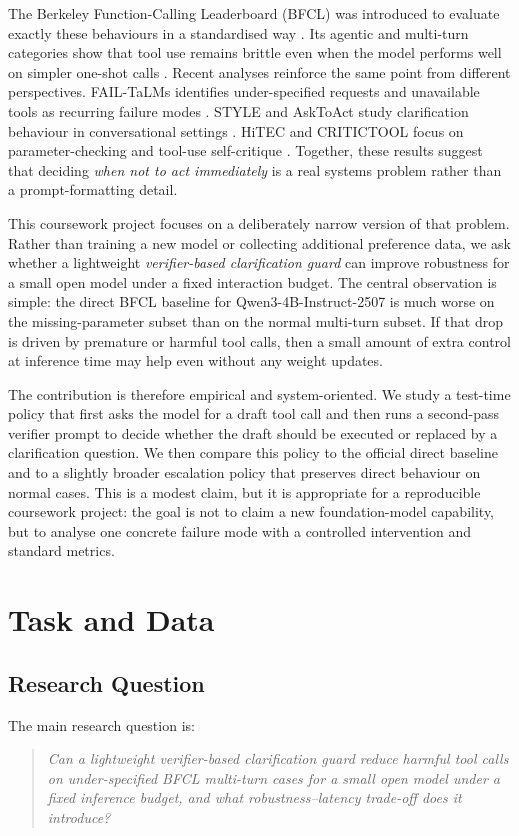 \documentclass[10pt,twocolumn]{article}
\newcommand{\PrimaryModel}{Qwen3-4B-Instruct-2507}
\begin{document}
The Berkeley Function-Calling Leaderboard (BFCL) was introduced to evaluate exactly these behaviours in a standardised way \citep{patil2025bfcl}. Its agentic and multi-turn categories show that tool use remains brittle even when the model performs well on simpler one-shot calls \citep{patil2025bfcl}. Recent analyses reinforce the same point from different perspectives. FAIL-TaLMs identifies under-specified requests and unavailable tools as recurring failure modes \citep{trevino2025failtalms}. STYLE and AskToAct study clarification behaviour in conversational settings \citep{chen2024style,zhang2025asktoact}. HiTEC and CRITICTOOL focus on parameter-checking and tool-use self-critique \citep{cui2025hitec,huang2025critictool}. Together, these results suggest that deciding \emph{when not to act immediately} is a real systems problem rather than a prompt-formatting detail.

This coursework project focuses on a deliberately narrow version of that problem. Rather than training a new model or collecting additional preference data, we ask whether a lightweight \emph{verifier-based clarification guard} can improve robustness for a small open model under a fixed interaction budget. The central observation is simple: the direct BFCL baseline for \PrimaryModel{} is much worse on the missing-parameter subset than on the normal multi-turn subset. If that drop is driven by premature or harmful tool calls, then a small amount of extra control at inference time may help even without any weight updates.

The contribution is therefore empirical and system-oriented. We study a test-time policy that first asks the model for a draft tool call and then runs a second-pass verifier prompt to decide whether the draft should be executed or replaced by a clarification question. We then compare this policy to the official direct baseline and to a slightly broader escalation policy that preserves direct behaviour on normal cases. This is a modest claim, but it is appropriate for a reproducible coursework project: the goal is not to claim a new foundation-model capability, but to analyse one concrete failure mode with a controlled intervention and standard metrics.

\section{Task and Data}
\subsection{Research Question}
The main research question is:
\begin{quote}
\emph{Can a lightweight verifier-based clarification guard reduce harmful tool calls on under-specified BFCL multi-turn cases for a small open model under a fixed inference budget, and what robustness--latency trade-off does it introduce?}
\end{quote}
\end{document}
